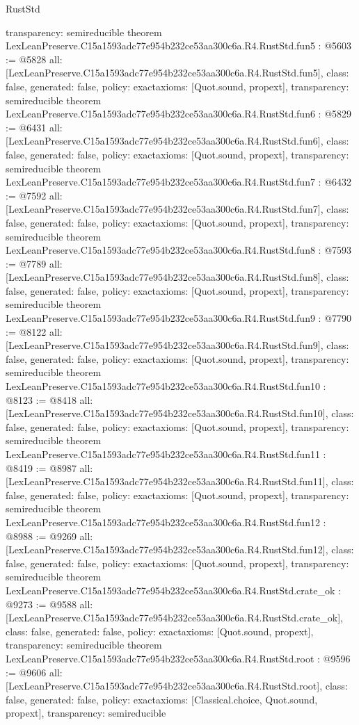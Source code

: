 \begin{lexlean}{RustStd}
\begin{coremodule}
{  transparency: semireducible
}
theorem LexLeanPreserve.C15a1593adc77e954b232ce53aa300c6a.R4.RustStd.fun5 : @5603 := @5828 {
  all: [LexLeanPreserve.C15a1593adc77e954b232ce53aa300c6a.R4.RustStd.fun5],
  class: false,
  generated: false,
  policy: exact{axioms: [Quot.sound, propext]},
  transparency: semireducible
}
theorem LexLeanPreserve.C15a1593adc77e954b232ce53aa300c6a.R4.RustStd.fun6 : @5829 := @6431 {
  all: [LexLeanPreserve.C15a1593adc77e954b232ce53aa300c6a.R4.RustStd.fun6],
  class: false,
  generated: false,
  policy: exact{axioms: [Quot.sound, propext]},
  transparency: semireducible
}
theorem LexLeanPreserve.C15a1593adc77e954b232ce53aa300c6a.R4.RustStd.fun7 : @6432 := @7592 {
  all: [LexLeanPreserve.C15a1593adc77e954b232ce53aa300c6a.R4.RustStd.fun7],
  class: false,
  generated: false,
  policy: exact{axioms: [Quot.sound, propext]},
  transparency: semireducible
}
theorem LexLeanPreserve.C15a1593adc77e954b232ce53aa300c6a.R4.RustStd.fun8 : @7593 := @7789 {
  all: [LexLeanPreserve.C15a1593adc77e954b232ce53aa300c6a.R4.RustStd.fun8],
  class: false,
  generated: false,
  policy: exact{axioms: [Quot.sound, propext]},
  transparency: semireducible
}
theorem LexLeanPreserve.C15a1593adc77e954b232ce53aa300c6a.R4.RustStd.fun9 : @7790 := @8122 {
  all: [LexLeanPreserve.C15a1593adc77e954b232ce53aa300c6a.R4.RustStd.fun9],
  class: false,
  generated: false,
  policy: exact{axioms: [Quot.sound, propext]},
  transparency: semireducible
}
theorem LexLeanPreserve.C15a1593adc77e954b232ce53aa300c6a.R4.RustStd.fun10 : @8123 := @8418 {
  all: [LexLeanPreserve.C15a1593adc77e954b232ce53aa300c6a.R4.RustStd.fun10],
  class: false,
  generated: false,
  policy: exact{axioms: [Quot.sound, propext]},
  transparency: semireducible
}
theorem LexLeanPreserve.C15a1593adc77e954b232ce53aa300c6a.R4.RustStd.fun11 : @8419 := @8987 {
  all: [LexLeanPreserve.C15a1593adc77e954b232ce53aa300c6a.R4.RustStd.fun11],
  class: false,
  generated: false,
  policy: exact{axioms: [Quot.sound, propext]},
  transparency: semireducible
}
theorem LexLeanPreserve.C15a1593adc77e954b232ce53aa300c6a.R4.RustStd.fun12 : @8988 := @9269 {
  all: [LexLeanPreserve.C15a1593adc77e954b232ce53aa300c6a.R4.RustStd.fun12],
  class: false,
  generated: false,
  policy: exact{axioms: [Quot.sound, propext]},
  transparency: semireducible
}
theorem LexLeanPreserve.C15a1593adc77e954b232ce53aa300c6a.R4.RustStd.crate_ok : @9273 := @9588 {
  all: [LexLeanPreserve.C15a1593adc77e954b232ce53aa300c6a.R4.RustStd.crate_ok],
  class: false,
  generated: false,
  policy: exact{axioms: [Quot.sound, propext]},
  transparency: semireducible
}
theorem LexLeanPreserve.C15a1593adc77e954b232ce53aa300c6a.R4.RustStd.root : @9596 := @9606 {
  all: [LexLeanPreserve.C15a1593adc77e954b232ce53aa300c6a.R4.RustStd.root],
  class: false,
  generated: false,
  policy: exact{axioms: [Classical.choice, Quot.sound, propext]},
  transparency: semireducible
}


\end{coremodule}
\end{lexlean}
